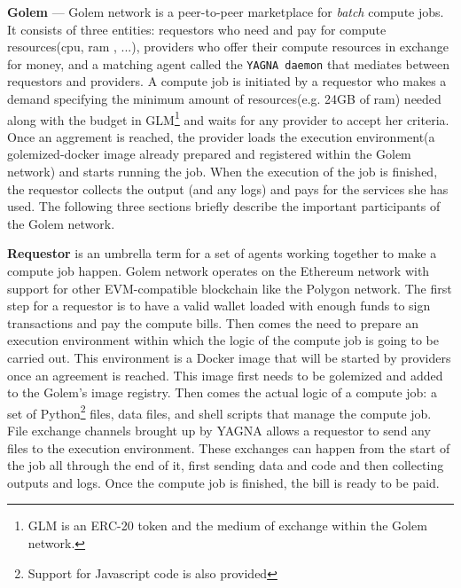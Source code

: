 \documentclass[a4paper, 10pt]{article}
\begin{document}
\par
\textbf{Golem} --- Golem network is a peer-to-peer marketplace for \textit{batch} compute jobs. It consists of three entities: requestors who need and pay for compute resources(cpu, ram , ...), providers who offer their compute resources in exchange for money, and a matching agent called the \texttt{YAGNA daemon} that mediates between requestors and providers. A compute job is initiated by a requestor who makes a demand specifying the minimum amount of resources(e.g. 24GB of ram) needed along with the budget in GLM\footnote{GLM is an ERC-20 token and the medium of exchange within the Golem network.} and waits for any provider to accept her criteria. Once an aggrement is reached, the provider loads the execution environment(a golemized-docker image already prepared and registered within the Golem network) and starts running the job. When the execution of the job is finished, the requestor collects the output (and any logs) and pays for the services she has used. The following three sections briefly describe the important participants of the Golem network.
\par
\textbf{Requestor} is an umbrella term for a set of agents working together to make a compute job happen. Golem network operates on the Ethereum network with support for other EVM-compatible blockchain like the Polygon network. The first step for a requestor is to have a valid wallet loaded with enough funds to sign transactions and pay the compute bills. Then comes the need to prepare an execution environment within which the logic of the compute job is going to be carried out. This environment is a Docker image that will be started by providers once an agreement is reached. This image first needs to be golemized and added to the Golem's image registry. Then comes the actual logic of a compute job: a set of Python\footnote{Support for Javascript code is also provided} files, data files, and shell scripts that manage the compute job. File exchange channels brought up by YAGNA allows a requestor to send any files to the execution environment. These exchanges can happen from the start of the job all through the end of it, first sending data and code and then collecting outputs and logs. Once the compute job is finished, the bill is ready to be paid.
\par
\end{document}
